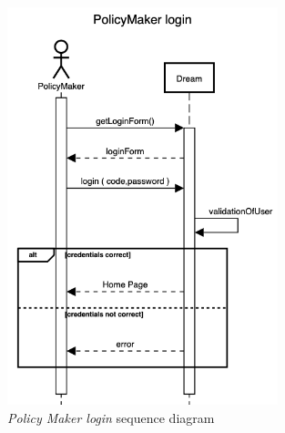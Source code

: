 \begin{enumerate}
\begin{figure}[H]
\begin{center}
        \includegraphics[width=0.7\textwidth]{sequence/PolicyMakerLogin.png}
        \caption{\emph{Policy Maker login} sequence diagram}
        \label{fig:state9}
        \end{center}
    \end{figure}


\end{enumerate}

